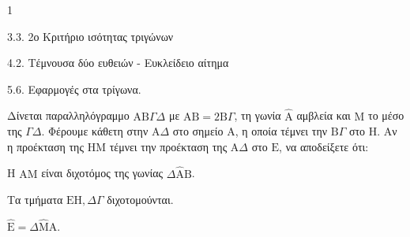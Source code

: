 \begin{ylh}{1}
    \item 3.3. 2ο Κριτήριο ισότητας τριγώνων
    \item 4.2. Τέμνουσα δύο ευθειών - Ευκλείδειο αίτημα
    \item 5.6. Εφαρμογές στα τρίγωνα.
\end{ylh}
Δίνεται παραλληλόγραμμο $\mathrm{A}\mathrm{B}\Gamma\Delta$ με $\mathrm{A}\mathrm{B} = 2 \mathrm{B}\Gamma$, τη γωνία $\hat{\mathrm{A}}$ αμβλεία και $\mathrm{M}$ το μέσο της $\Gamma\Delta$. Φέρουμε κάθετη στην $\mathrm{A}\Delta$ στο σημείο $\mathrm{A}$, η οποία τέμνει την $\mathrm{B}\Gamma$ στο $\mathrm{H}$. Αν η προέκταση της $\mathrm{H}\mathrm{M}$ τέμνει την προέκταση της $\mathrm{A}\Delta$ στο $\mathrm{E}$, να αποδείξετε ότι:
\begin{alist}
    \item Η $\mathrm{A}\mathrm{M}$ είναι διχοτόμος της γωνίας $\Delta\hat{\mathrm{A}}\mathrm{B}$. 
    \item Τα τμήματα $\mathrm{E}\mathrm{H}, \Delta\Gamma$ διχοτομούνται. 
    \item $\hat{\mathrm{E}} = \Delta\hat{\mathrm{M}}\mathrm{A}$. 
\end{alist}
